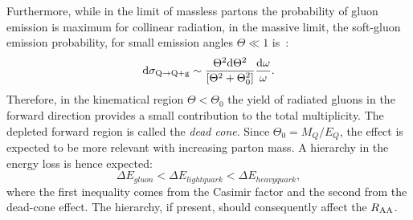Furthermore, while in the limit of massless partons the probability of gluon emission is maximum for collinear radiation,
in the massive limit, the soft-gluon emission probability, for small emission angles $\Theta \ll 1$ is~\cite{Dokshitzer:1991fd}:
\begin{equation}
\label{eq:DeadCone}
\rm d \sigma_{Q \rightarrow Q + g} \sim \frac{\Theta^2 \rm d \Theta^2}{[\Theta^2+ \Theta^2_0]} \frac{\rm d \omega}{\omega}.
\end{equation}
Therefore, in the kinematical region $\Theta < \Theta_0$ the yield of radiated gluons
in the forward direction provides a small contribution to the total multiplicity. The depleted forward region is called the {\it dead cone}.
Since $\Theta_0 = M_Q/E_Q$, the effect is expected to be more relevant with increasing parton mass. A hierarchy in 
the energy loss is hence expected:
\begin{equation}
\label{eq:HierachyRaa}
\Delta E_{gluon} < \Delta E_{lightquark} < \Delta E_{heavyquark},
\end{equation}
where the first inequality comes from the Casimir factor and the second from the dead-cone effect. The hierarchy, if present, 
should consequently affect the $R_{\rm AA}$.\\


